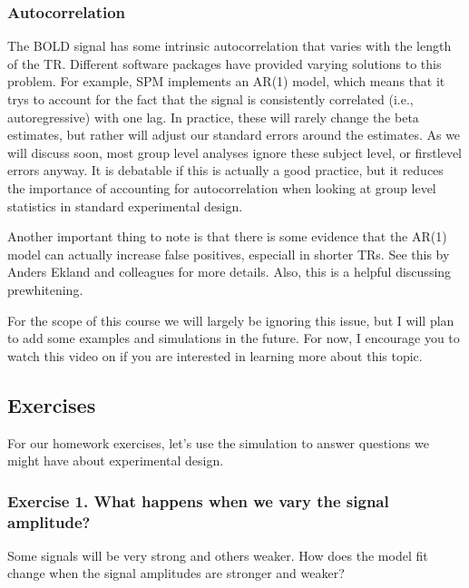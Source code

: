 \documentclass[letterpaper,10pt,english]{sphinxmanual}
\begin{document}
\subsubsection{Autocorrelation}
\label{\detokenize{content/GLM:autocorrelation}}
The BOLD signal has some intrinsic autocorrelation that varies with the length of the TR. Different software packages have provided varying solutions to this problem. For example, SPM implements an AR(1) model, which means that it trys to account for the fact that the signal is consistently correlated (i.e., autoregressive) with one lag. In practice, these will rarely change the beta estimates, but rather will adjust our standard errors around the estimates. As we will discuss soon, most group level analyses ignore these subject level, or first\sphinxhyphen{}level errors anyway. It is debatable if this is actually a good practice, but it reduces the importance of accounting for autocorrelation when looking at group level statistics in standard experimental design.

Another important thing to note is that there is some evidence that the AR(1) model can actually increase false positives, especiall in shorter TRs.  See this  by Anders Ekland and colleagues for more details. Also, this is a helpful  discussing prewhitening.

For the scope of this course we will largely be ignoring this issue, but I will plan to add some examples and simulations in the future.  For now, I encourage you to watch this video on  if you are interested in learning more about this topic.


\subsection{Exercises}
\label{\detokenize{content/GLM:exercises}}
For our homework exercises, let’s use the simulation to answer questions we might have about experimental design.


\subsubsection{Exercise 1. What happens when we vary the signal amplitude?}
\label{\detokenize{content/GLM:exercise-1-what-happens-when-we-vary-the-signal-amplitude}}
Some signals will be very strong and others weaker. How does the model fit change when the signal amplitudes are stronger and weaker?
\end{document}
